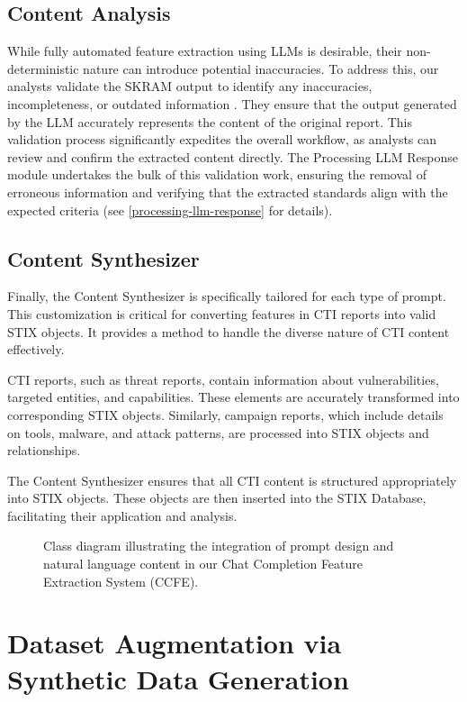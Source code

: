 \documentclass[running heads]{llncs}
\begin{document}
\subsection{Content Analysis}
 While fully automated feature extraction using LLMs is desirable, their non-deterministic nature can introduce potential inaccuracies. To address this, our analysts validate the SKRAM output to identify any inaccuracies, incompleteness, or outdated information \cite{Schlette2021}. They ensure that the output generated by the LLM accurately represents the content of the original report. This validation process significantly expedites the overall workflow, as analysts can review and confirm the extracted content directly. The Processing LLM Response module undertakes the bulk of this validation work, ensuring the removal of erroneous information and verifying that the extracted standards align with the expected criteria (see \ref{processing-llm-response} for details).

\subsection{Content Synthesizer}
Finally, the Content Synthesizer is specifically tailored for each type of prompt. This customization is critical for converting features in CTI reports into valid STIX objects. It provides a method to handle the diverse nature of CTI content effectively.

CTI reports, such as threat reports, contain information about vulnerabilities, targeted entities, and capabilities. These elements are accurately transformed into corresponding STIX objects. Similarly, campaign reports, which include details on tools, malware, and attack patterns, are processed into STIX objects and relationships.

The Content Synthesizer ensures that all CTI content is structured appropriately into STIX objects. These objects are then inserted into the STIX Database, facilitating their application and analysis.

\begin{figure}
  \captionsetup{
    belowskip=-8pt,
  }
  \centering
    \caption{Class diagram illustrating the integration of prompt design and natural language content in our Chat Completion Feature Extraction System (CCFE).}
  \label{fig:llm_management}
\end{figure}


\section{Dataset Augmentation via Synthetic Data Generation}\label{synth-date-generation}
\end{document}
